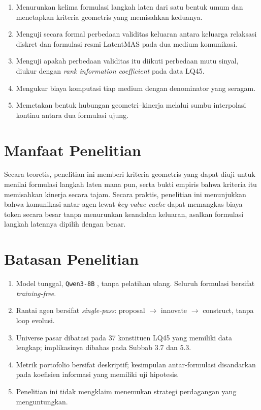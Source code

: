 \documentclass{laporanta1statugm}
\newcommand{\code}[1]{\texttt{#1}}
\begin{document}
\begin{enumerate}
  \item Menurunkan kelima formulasi langkah laten dari satu bentuk umum dan
        menetapkan kriteria geometris yang memisahkan keduanya.
  \item Menguji secara formal perbedaan validitas keluaran antara keluarga
        relaksasi diskret dan formulasi resmi LatentMAS pada dua medium
        komunikasi.
  \item Menguji apakah perbedaan validitas itu diikuti perbedaan mutu sinyal,
        diukur dengan \textit{rank information coefficient} pada data LQ45.
  \item Mengukur biaya komputasi tiap medium dengan denominator yang seragam.
  \item Memetakan bentuk hubungan geometri--kinerja melalui sumbu interpolasi
        kontinu antara dua formulasi ujung.
\end{enumerate}

\section{Manfaat Penelitian}

Secara teoretis, penelitian ini memberi kriteria geometris yang dapat diuji
untuk menilai formulasi langkah laten mana pun, serta bukti empiris bahwa
kriteria itu memisahkan kinerja secara tajam. Secara praktis, penelitian ini
menunjukkan bahwa komunikasi antar-agen lewat \textit{key-value cache} dapat
memangkas biaya token secara besar tanpa menurunkan keandalan keluaran, asalkan
formulasi langkah latennya dipilih dengan benar.

\section{Batasan Penelitian}

\begin{enumerate}
  \item Model tunggal, \code{Qwen3-8B} \citep{qwen3}, tanpa pelatihan ulang.
        Seluruh formulasi bersifat \textit{training-free}.
  \item Rantai agen bersifat \textit{single-pass}: proposal $\to$ innovate
        $\to$ construct, tanpa loop evolusi.
  \item Universe pasar dibatasi pada 37 konstituen LQ45 yang memiliki data
        lengkap; implikasinya dibahas pada Subbab 3.7 dan 5.3.
  \item Metrik portofolio bersifat deskriptif; kesimpulan antar-formulasi
        disandarkan pada koefisien informasi yang memiliki uji hipotesis.
  \item Penelitian ini tidak mengklaim menemukan strategi perdagangan yang
        menguntungkan.
\end{enumerate}
\end{document}
